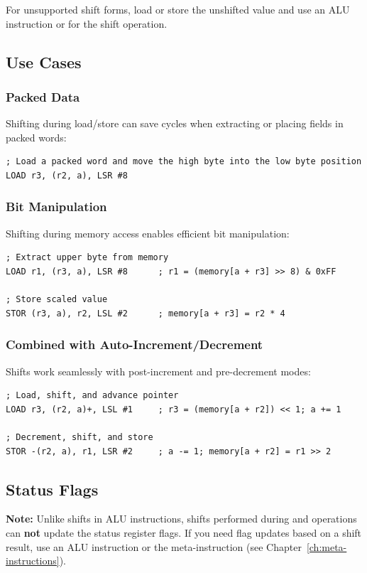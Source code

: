 For unsupported shift forms, load or store the unshifted value and use an ALU instruction or  for the
shift operation.

\subsection{Use Cases}

\subsubsection{Packed Data}

Shifting during load/store can save cycles when extracting or placing fields in packed words:

\begin{lstlisting}
; Load a packed word and move the high byte into the low byte position
LOAD r3, (r2, a), LSR #8
\end{lstlisting}

\subsubsection{Bit Manipulation}

Shifting during memory access enables efficient bit manipulation:

\begin{lstlisting}
; Extract upper byte from memory
LOAD r1, (r3, a), LSR #8      ; r1 = (memory[a + r3] >> 8) & 0xFF

; Store scaled value
STOR (r3, a), r2, LSL #2      ; memory[a + r3] = r2 * 4
\end{lstlisting}

\subsubsection{Combined with Auto-Increment/Decrement}

Shifts work seamlessly with post-increment and pre-decrement modes:

\begin{lstlisting}
; Load, shift, and advance pointer
LOAD r3, (r2, a)+, LSL #1     ; r3 = (memory[a + r2]) << 1; a += 1

; Decrement, shift, and store
STOR -(r2, a), r1, LSR #2     ; a -= 1; memory[a + r2] = r1 >> 2
\end{lstlisting}

\subsection{Status Flags}

\textbf{Note:} Unlike shifts in ALU instructions, shifts performed during  and  operations can \textbf{not} update the status register flags. If you need flag updates based on a shift result, use an ALU instruction or the  meta-instruction (see Chapter~\ref{ch:meta-instructions}).
